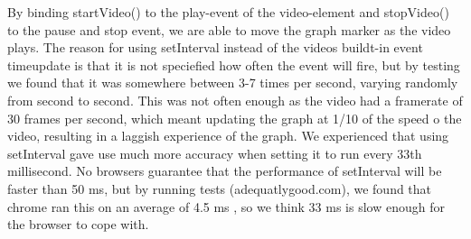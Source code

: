 By binding startVideo() to the play-event of the video-element and stopVideo() to the pause and stop event, we are able to move the graph marker as the video plays. The reason for using setInterval instead of the videos buildt-in event timeupdate is that it is not speciefied how often the event will fire, but by testing we found that it was somewhere between 3-7 times per second, varying randomly from second to second. This was not often enough as the video had a framerate of 30 frames per second, which meant updating the graph at 1/10 of the speed o the video, resulting in a laggish experience of the graph. We experienced that using setInterval gave use much more accuracy when setting it to run every 33th millisecond. No browsers guarantee that the performance of setInterval will be faster than 50 ms, but by running tests (adequatlygood.com), we found that chrome ran this on an average of 4.5 ms , so we think 33 ms is slow enough for the browser to cope with.